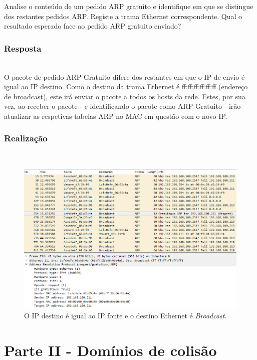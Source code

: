 \documentclass{llncs}
\begin{document}
Analise o conteúdo de um pedido ARP gratuito e identifique em que se distingue dos restantes pedidos ARP. Registe a trama Ethernet correspondente. Qual o resultado esperado face ao pedido ARP gratuito enviado?

\subsubsection{Resposta}\rule[-10pt]{0pt}{10pt}\\

O pacote de pedido ARP Gratuito difere dos restantes em que o IP de envio é igual ao IP destino. Como o destino da trama Ethernet é ff:ff:ff:ff:ff:ff (endereço de broadcast), este irá enviar o pacote a todos os hosts da rede. Estes, por sua vez, ao receber o pacote - e identificando o pacote como ARP Gratuito - irão atualizar as respetivas tabelas ARP no MAC em questão com o novo IP.

\subsubsection{Realização}\rule[-10pt]{0pt}{10pt}\\

\begin{figure}
  \begin{center}
    \includegraphics[scale=0.6]{./imagens/ARPG_IP.png} 
  \end{center}
  \caption{O IP destino é igual ao IP fonte e o destino Ethernet é \textit{Broadcast}.}
  \label{fig:arpg_ip}
\end{figure} 


\clearpage
\section{Parte II - Domínios de colisão}
\end{document}
